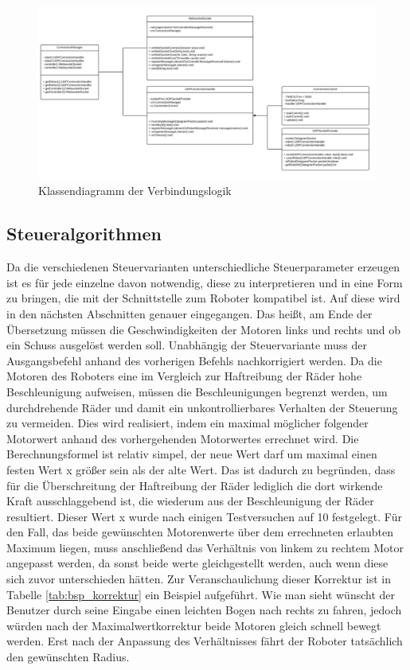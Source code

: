 \begin{figure}[!h]
	\includegraphics[width=\textwidth]{images/uml_verbindung.pdf}
	\caption{Klassendiagramm der Verbindungslogik}
	\label{fig:uml_verbindung}
\end{figure}



\subsection{Steueralgorithmen}
Da die verschiedenen Steuervarianten unterschiedliche Steuerparameter erzeugen ist es für jede einzelne davon notwendig, diese zu interpretieren und in eine Form zu bringen, die mit der Schnittstelle zum Roboter kompatibel ist. Auf diese wird in den nächsten Abschnitten genauer eingegangen. Das heißt, am Ende der Übersetzung müssen die Geschwindigkeiten der Motoren links und rechts und ob ein Schuss ausgelöst werden soll. Unabhängig der Steuervariante muss der Ausgangsbefehl anhand des vorherigen Befehls nachkorrigiert werden. Da die Motoren des Roboters eine im Vergleich zur Haftreibung der Räder hohe Beschleunigung aufweisen, müssen die Beschleunigungen begrenzt werden, um durchdrehende Räder und damit ein unkontrollierbares Verhalten der Steuerung zu vermeiden. 
Dies wird realisiert, indem ein maximal möglicher folgender Motorwert anhand des vorhergehenden Motorwertes errechnet wird. Die Berechnungsformel ist relativ simpel, der neue Wert darf um maximal einen festen Wert x größer sein als der alte Wert. Das ist dadurch zu begründen, dass für die Überschreitung der Haftreibung der Räder lediglich die dort wirkende Kraft ausschlaggebend ist, die wiederum aus der Beschleunigung der Räder resultiert. Dieser Wert x wurde nach einigen Testversuchen auf 10 festgelegt. Für den Fall, das beide gewünschten Motorenwerte über dem errechneten erlaubten Maximum liegen, muss anschließend das Verhältnis von linkem zu rechtem Motor angepasst werden, da sonst beide werte gleichgestellt werden, auch wenn diese sich zuvor unterschieden hätten. 
Zur Veranschaulichung dieser Korrektur ist in Tabelle \ref{tab:bsp_korrektur} ein Beispiel aufgeführt. Wie man sieht wünscht der Benutzer durch seine Eingabe einen leichten Bogen nach rechts zu fahren, jedoch würden nach der Maximalwertkorrektur beide Motoren gleich schnell bewegt werden. Erst nach der Anpassung des Verhältnisses fährt der Roboter tatsächlich den gewünschten Radius.

